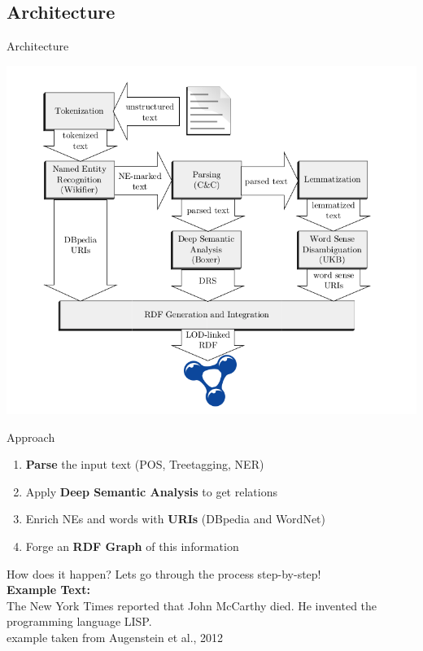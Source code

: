 \documentclass[11pt]{beamer}
\begin{document}
	\subsection{Architecture}
		\begin{frame}{Architecture}
			\begin{center}
				\includegraphics[scale=0.25]{img/oie-lodifier-architecture.png}
			\end{center}
		\end{frame}
		
		\begin{frame}{Approach}
			\begin{enumerate}
				\item \textbf{Parse} the input text (POS, Treetagging, NER)
				\item Apply \textbf{Deep Semantic Analysis} to get relations
				\item Enrich NEs and words with \textbf{URIs} (DBpedia and WordNet)
				\item Forge an \textbf{RDF Graph} of this information
			\end{enumerate}					
		\end{frame}
		
		\begin{frame}{How does it happen?}
			Lets go through the process step-by-step!\\
			\vspace{15pt}
			\textbf{Example Text:}\\
			The New York Times reported that John McCarthy died. He invented the programming language LISP.\\
			\tiny{example taken from Augenstein et al., 2012}			
		\end{frame}
\end{document}
